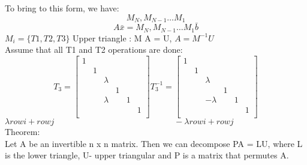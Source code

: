 \documentclass{article}
\begin{document}
To bring to this form, we have:
$$ M_N, M_{N-1} \dots M_1 $$
$$ A\bar{x} = M_N, M_{N-1} \dots M_1 \bar{b} $$ $M_i = \{T1,T2,T3\}$
Upper triangle : M A = U, $A = M^{-1} U $ \\

Assume that all T1 and T2 operations are done:\\
$$ T_3 = 
\begin{bmatrix}
1 & & & & &  \\
   & 1 & & & & \\
   &  & \lambda & & &  \\
   &  & & 1& &  \\
   &  & \lambda& & 1 &  \\
   & & & & & 1 \\
\end{bmatrix}
T_3^{-1} = \begin{bmatrix}
1 & & & & &  \\
   & 1 & & & & \\
   &  & \lambda & & &  \\
   &  & & 1& &  \\
   &  & -\lambda& & 1 &  \\
   & & & & & 1 \\
\end{bmatrix} 
$$  $ \lambda row i + row j  \hspace{6cm }-\lambda row i + row j $ \\

Theorem:\\
Let A be an invertible n x n matrix. Then we can decompose PA = LU, where L is the lower triangle, U- upper triangular and P is a matrix that permutes A.\\
\end{document}
